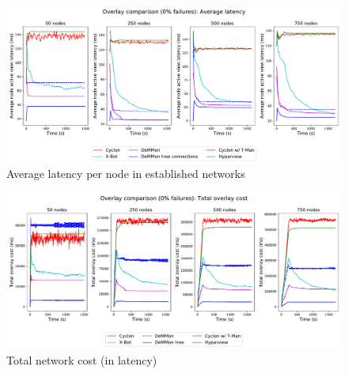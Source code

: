 \begin{figure}
    \centering
    \includegraphics[width=\linewidth]{Chapters/evaluation/figures/membership/membership_lat_over_time_0_failures.pdf}
    \caption{Average latency per node in established networks}
    \label{fig:overlay_proto_res_net_building:0_failures_lat}
\end{figure}


\begin{figure}
    \centering
    \includegraphics[width=\linewidth]{Chapters/evaluation/figures/membership/membership_total_lat_over_time_0_failures.pdf}
    \caption{Total network cost (in latency)}
    \label{fig:overlay_proto_res_net_building:0_failures_lat_total}
\end{figure}

